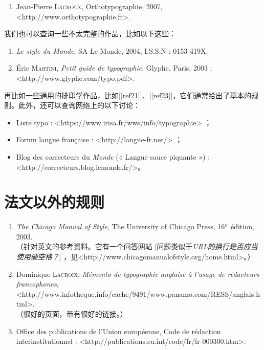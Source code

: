 \begin{enumerate}[resume]
    \item Jean-Pierre \textsc{Lacroux}, Orthotypographie, 2007, <http://www.orthotypographie.fr>.
\end{enumerate}

我们也可以查询一些不太完整的作品，比如以下这些：

\begin{enumerate}[resume]
    \item \emph{Le style du Monde}, SA Le Monde, 2004, I.S.S.N : 0153-419X.
    \item Éric \textsc{Martini}, \emph{Petit guide de typographie}, Glyphe, Paris, 2003 ; <http://www.glyphe.com/typo.pdf>.
\end{enumerate}

再比如一些通用的排印学作品，比如[\ref{ref21}]、[\ref{ref23}]，它们通常给出了基本的规则。此外，还可以查询网络上的以下讨论：

\begin{itemize}
    \item Liste typo : <https://www.irisa.fr/wws/info/typographie> ；
    \item Forum langue française : <http://langue-fr.net/> ；
    \item Blog des correcteurs du \emph{Monde} (« Langue sauce piquante ») :
    <http://correcteurs.blog.lemonde.fr/>。
\end{itemize}

\section{法文以外的规则}

\begin{enumerate}[resume]
    \item \emph{The Chicago Manual of Style}, The University of Chicago Press, 16$^{\rm e}$ édition, 2003.\\
    （针对英文的参考资料。它有一个问答网站 [问题类似于\emph{URL的换行是否应当使用硬空格？}] ，见<http://www.chicagomanualofstyle.org/home.html>。）
    \item Dominique \textsc{Lacroix}, \emph{Mémento de typographie anglaise à l'usage de rédacteurs francophones}, <http://www.infotheque.info/cache/9491/www.panamo.com/RESS/anglais.html>.\\
    （很好的页面，带有很好的链接。）
    \item Office des publications de l'Union européenne, Code de rédaction interinstitutionnel : <http://publications.eu.int/code/fr/fr-000300.htm>.
\end{enumerate}

